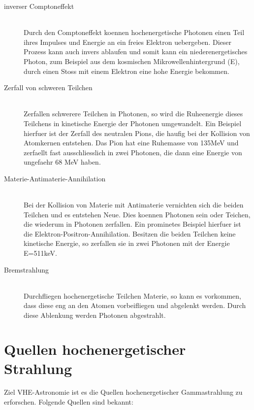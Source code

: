 \begin{description}
\item[inverser Comptoneffekt]\hfill \\
Durch den Comptoneffekt koennen hochenergetische Photonen einen Teil ihres Impulses und Energie an ein freies Elektron uebergeben. Dieser Prozess kann auch invers ablaufen und somit kann ein niederenergetisches Photon, zum Beispiel aus dem kosmischen Mikrowellenhintergrund (E), durch einen Stoss mit einem Elektron eine hohe Energie bekommen.
\item[Zerfall von schweren Teilchen]\hfill \\ 
Zerfallen schwerere Teilchen in Photonen, so wird die Ruheenergie dieses Teilchens in kinetische Energie der Photonen umgewandelt. Ein Beispiel hierfuer ist der Zerfall des neutralen Pions, die haufig bei der Kollision von Atomkernen entstehen. Das Pion hat eine Ruhemasse von 135MeV 
und zerfaellt fast ausschliesslich in zwei Photonen, die dann eine Energie von ungefaehr 68 MeV haben.
\item[Materie-Antimaterie-Annihilation]\hfill \\
Bei der Kollision von Materie mit Antimaterie vernichten sich die beiden Teilchen und es entstehen Neue. Dies koennen Photonen sein oder Teichen, die wiederum in Photonen zerfallen. Ein prominetes Beispiel hierfuer ist die Elektron-Positron-Annihilation. Besitzen die beiden Teilchen keine kinetische Energie, so zerfallen sie in zwei Photonen mit der Energie E=511keV.
\item[Bremstrahlung]\hfill \\
Durchfliegen hochenergetische Teilchen Materie, so kann es vorkommen, dass diese eng an den Atomen vorbeifliegen und abgelenkt werden. Durch diese Ablenkung werden Photonen abgestrahlt.
\end{description}

\section{Quellen hochenergetischer Strahlung}
Ziel VHE-Astronomie ist es die Quellen hochenergetischer Gammastrahlung zu erforschen. Folgende Quellen sind bekannt:

